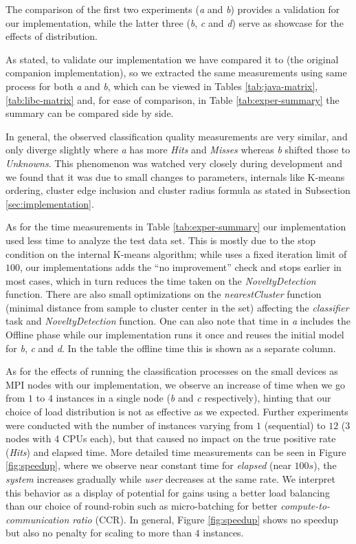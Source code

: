 The comparison of the first two experiments (\emph{a} and \emph{b}) provides a
validation for our implementation, while the latter three (\emph{b}, \emph{c}
and \emph{d}) serve as showcase for the effects of distribution.

As stated, to validate our implementation we have compared it to 
(the original \minas companion implementation), so we extracted the same measurements
using same process for both \emph{a} and \emph{b}, which can be viewed in
Tables \ref{tab:java-matrix}, \ref{tab:libc-matrix} and, for ease of comparison,
in Table \ref{tab:exper-summary} the summary can be compared side by side.

In general, the observed classification quality measurements are very similar,
and only diverge slightly where \emph{a} has more \emph{Hits} and \emph{Misses}
whereas \emph{b} shifted those to \emph{Unknowns}.
This phenomenon was watched very closely during development and we found that it was due to
small changes to \minas parameters, \minas internals like K-means ordering,
cluster edge inclusion and cluster radius formula as stated in
Subsection \ref{sec:implementation}.

As for the time measurements in Table \ref{tab:exper-summary}
our implementation used less time to analyze the test data set.
This is mostly due to 
the stop condition
on the internal K-means algorithm; while  uses a fixed iteration
limit of $100$, our implementations adds the ``no improvement'' check
and stops earlier in most cases, which in turn reduces the time taken
on the \emph{NoveltyDetection} function.
There are also small optimizations on the \emph{nearestCluster} function
(minimal distance from sample to cluster center in the set)
affecting the \emph{classifier} task and \emph{NoveltyDetection} function.
One can also note that  time in \emph{a} includes the Offline phase while our
implementation runs it once and reuses the initial model for \emph{b}, \emph{c}
and \emph{d}. In the table the offline time this is shown as a separate column.

As for the effects of running the classification processes on the small devices as MPI nodes with our implementation, we observe
an increase of time when we go from $1$ to $4$ instances in a single node
(\emph{b} and \emph{c} respectively), hinting that our choice of load
distribution is not as effective as we expected.
Further experiments were conducted with the number of instances varying from $1$ (sequential) to
$12$ (3 nodes with 4 CPUs each), but that caused no impact on the true positive rate (\emph{Hits}) and elapsed time.
More detailed time measurements can be seen in Figure \ref{fig:speedup},
where we observe near constant time for \emph{elapsed} (near $100s$),
the \emph{system} increases gradually while \emph{user} decreases at the same rate.
We interpret this behavior as a display of potential for gains using a better
load balancing than our choice of round-robin such as micro-batching for better
\emph{compute-to-communication ratio} (CCR).
In general, Figure \ref{fig:speedup} shows no speedup but also no penalty for
scaling to more than $4$ instances.

